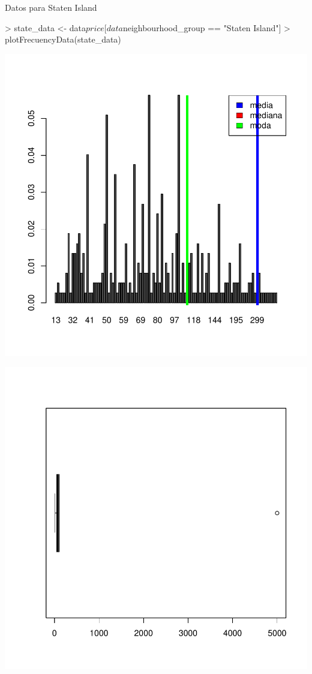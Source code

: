 \documentclass [a4paper] {article}
\begin{document}
Datos para Staten Island
\begin{center}
\begin{Schunk}
\begin{Sinput}
> state_data <- data$price[data$neighbourhood_group == "Staten Island"]
> plotFrecuencyData(state_data)
\end{Sinput}
\end{Schunk}
\includegraphics{entrega-032}
\end{center}
\begin{center}
\includegraphics{entrega-033}
\end{center}
\end{document}
